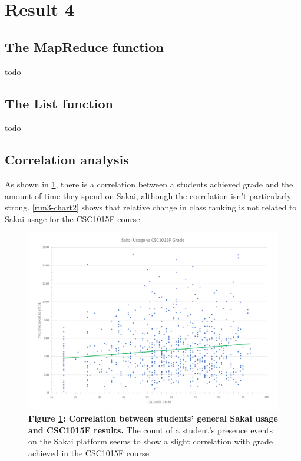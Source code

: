 \section{Result 4}

\subsection*{The MapReduce function}
todo

\subsection*{The List function}
todo


\subsection{Correlation analysis}
As shown in \ref{run3-chart1}, there is a correlation between a students achieved grade and the amount of time they spend on Sakai, although the correlation isn't particularly strong. \ref{run3-chart2} shows that relative change in class ranking is not related to Sakai usage for the CSC1015F course.


\begin{figure}[H]
    \centering
    \begin{mdframed}
        \centering
        \includegraphics[scale=0.55]{./resources/figures/run3-chart1.png}
    \end{mdframed}
    \caption[CSC1015 grade vs general Sakai usage]{\textbf{Figure \ref{run3-chart1}: Correlation between students' general Sakai usage and CSC1015F results.} The count of a student's presence events on the Sakai platform seems to show a slight correlation with grade achieved in the CSC1015F course.}
    \label{run3-chart1}
\end{figure}

